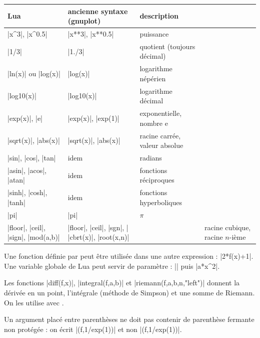 \begin{center}
\begin{tabular}{lll}
\toprule
Lua & ancienne syntaxe (gnuplot) & description \\
\midrule
|x^3|, |x^0.5| & |x**3|, |x**0.5| & puissance \\
|1/3| & |1./3| & quotient (toujours décimal) \\
|ln(x)| ou |log(x)| & |log(x)| & logarithme népérien \\
|log10(x)| & |log10(x)| & logarithme décimal \\
|exp(x)|, |e| & |exp(x)|, |exp(1)| & exponentielle, nombre $\text{e}$ \\
|sqrt(x)|, |abs(x)| & |sqrt(x)|, |abs(x)| & racine carrée, valeur absolue \\
|sin|, |cos|, |tan| & idem & radians \\
|asin|, |acos|, |atan| & idem & fonctions réciproques \\
|sinh|, |cosh|, |tanh| & idem & fonctions hyperboliques \\
|pi| & |pi| & $\pi$ \\
|floor|, |ceil|, |sign|, |mod(a,b)| & |floor|, |ceil|, |sgn|, |%
|cbrt(x)|, |root(x,n)| & & racine cubique, racine $n$-ième \\
\bottomrule
\end{tabular}
\end{center}

\tkzHand Une fonction définie par  peut être utilisée dans une autre expression : |2*f(x)+1|. Une variable globale de Lua peut servir de paramètre : || puis |a*x^2|.

\tkzHand Les fonctions |diff(f,x)|, |integral(f,a,b)| et |riemann(f,a,b,n,"left")| donnent la dérivée en un point, l'intégrale (méthode de Simpson) et une somme de Riemann. On les utilise avec .

\tkzBomb Un argument placé entre parenthèses ne doit pas contenir de parenthèse fermante non protégée : on écrit |(f,{1/exp(1)})| et non |(f,1/exp(1))|.

\endinput
